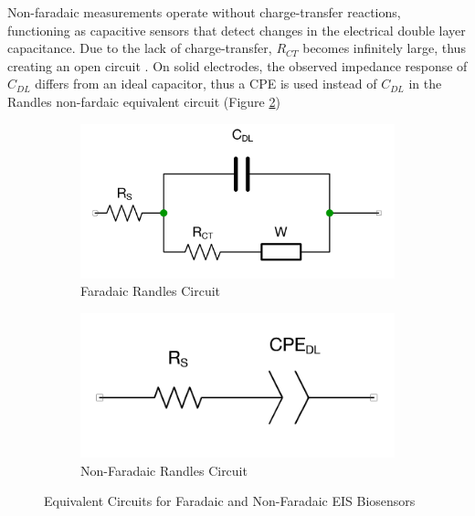 Non-faradaic measurements operate without charge-transfer reactions, functioning as capacitive sensors that detect changes in the electrical double layer capacitance. Due to the lack of charge-transfer, $R_{CT}$ becomes infinitely large, thus creating an open circuit \cite{xieReviewAdvancementsNanoscale2020a}. On solid electrodes, the observed impedance response of $C_{DL}$ differs from an ideal capacitor, thus a \ac{CPE} is used instead of $C_{DL}$ in the Randles non-fardaic equivalent circuit (Figure \ref{fig:randles_non_faradaic}) 

\begin{figure}[ht]
    \centering
    \begin{subfigure}{0.45\textwidth}
        \centering
        \includegraphics[width=\textwidth]{RandlesFaradaic.png}
        \caption{Faradaic Randles Circuit}
        \label{fig:randles_fardaic}
    \end{subfigure}
    \hfill
    \begin{subfigure}{0.45\textwidth}
        \centering
        \includegraphics[width=\textwidth]{RandlesNonFaradaic.png}
        \caption{Non-Faradaic Randles Circuit}
        \label{fig:randles_non_faradaic}    
    \end{subfigure}
    \caption{Equivalent Circuits for Faradaic and Non-Faradaic EIS Biosensors}
    \label{fig:randles_circuits}
\end{figure}

